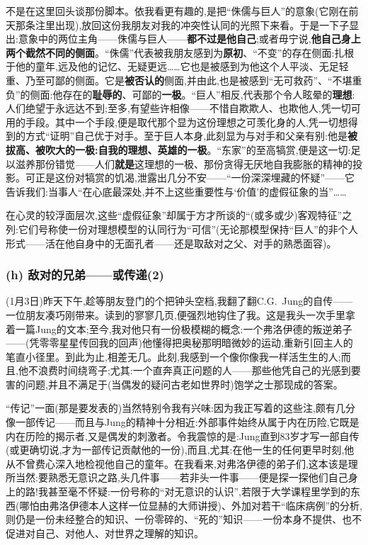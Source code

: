 不是在这里回头谈那份脚本。依我看更有趣的,是把“侏儒与巨人”的意象(它刚在前天那条注里出现),放回这份我朋友对我的冲突性认同的光照下来看。于是一下子显出:意象中的两位主角——侏儒与巨人——\textbf{都不过是他自己};或者毋宁说,\textbf{他自己身上两个截然不同的侧面}。“侏儒”代表被我朋友感到为\textbf{原初}、“不变”的存在侧面:扎根于他的童年,远及他的记忆、无疑更远……它也是被感到为他这个人平淡、无足轻重、乃至可鄙的侧面。它是\textbf{被否认的}侧面,并由此,也是被感到“无可救药”、“不堪重负”的侧面:他存在的\textbf{耻辱的}、可鄙的\textbf{一极}。“巨人”相反,代表那个令人眩晕的\textbf{理想}:人们绝望于永远达不到\dmark{};至多,有望些许相像——不惜自欺欺人、也欺他人,凭一切可用的手段。其中一个手段,便是取代那个显为这份理想之可羡化身的人,凭一切想得到的方式“证明”自己优于对手。至于巨人本身,此刻显为与对手和父亲有别:他是\textbf{被拔高、被吹大的一极:自我的理想、英雄的一极}。“东家”的至高犒赏,便是这一切:足以滋养那份错觉——人们\textbf{就是}这理想的一极、那份贪得无厌地自我膨胀的精神的投影。可正是这份对犒赏的饥渴,泄露出几分不安——“一份深深埋藏的怀疑”——它告诉我们:当事人“在心底最深处,并不上这些重要性与‘价值’的虚假征象的当”……

在心灵的较浮面层次,这些“虚假征象”却属于方才所谈的“(或多或少)客观特征”之列:它们号称使一份对理想模型的认同行为“可信”(无论那模型保持“巨人”的非个人形式——活在他自身中的无面孔者——还是取敌对之父、对手的熟悉面容)。

\subsubsection*{(h) 敌对的兄弟——或传递(2)}
\label{ch18:local:h69}

\label{ch18:local:n64}

(1月3日)昨天下午,趁等朋友登门的个把钟头空档,我翻了翻C.G.~Jung的自传——一位朋友凑巧刚带来。读到的寥寥几页,便强烈地钩住了我。这是我头一次手里拿着一篇Jung的文本;至今,我对他只有一份极模糊的概念:一个弗洛伊德的叛逆弟子——(凭零零星星传回我的回声)他懂得把奥秘那明暗微妙的运动,重新引回主人的笔直小径里。到此为止,相差无几。此刻,我感到一个像你像我一样活生生的人;而且,他不浪费时间绕弯子;尤其:一个直奔真正问题的人——那些他凭自己的光感到要害的问题,并且不满足于(当偶发的疑问古老如世界时)饱学之士那现成的答案\dmark{}。

“传记”一面(那是要发表的)当然特别令我有兴味:因为我正写着的这些注,颇有几分像一部传记——而且与Jung的精神十分相近:外部事件始终从属于内在历险,它既是内在历险的揭示者,又是偶发的刺激者。令我震惊的是:Jung直到83岁才写一部自传(或更确切说,才为一部传记贡献他的一份),而且,尤其:在他一生的任何更早时刻,他从不曾费心深入地检视他自己的童年。在我看来,对弗洛伊德的弟子们,这本该是理所当然:要熟悉无意识之路,头几件事——若非头一件事——便是探一探他们自己身上的路!我甚至毫不怀疑:一份号称的“对无意识的认识”,若限于大学课程里学到的东西(哪怕由弗洛伊德本人这样一位显赫的大师讲授)、外加对若干“临床病例”的分析,则仍是一份未经整合的知识、一份零碎的、“死的”知识——一份本身不提供、也不促进对自己、对他人、对世界之理解的知识。

